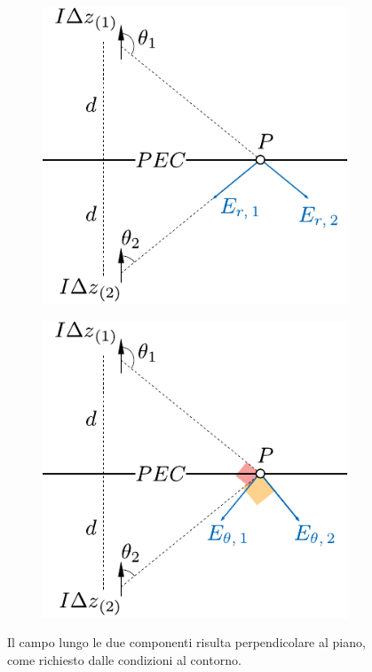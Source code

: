 \begin{figure}[htp]
	\centering
	\begin{subfigure}{.45\textwidth}
		\centering
		\includegraphics[]{img/piano_di_massa_r.pdf}
		\caption{}
		\label{fig:piano_di_massa_r}
	\end{subfigure}\hfill%
	\begin{subfigure}{.45\textwidth}
		\centering
		\includegraphics[]{img/piano_di_massa_theta.pdf}
		\caption{}
		\label{fig:piano_di_massa_r}
	\end{subfigure}
	\caption{Il campo lungo le due componenti risulta perpendicolare al piano, come richiesto dalle condizioni al contorno.}
	\label{fig:piano_di_massa}
\end{figure}

